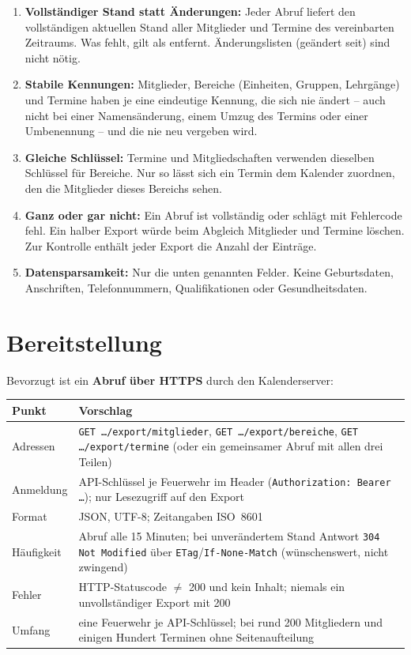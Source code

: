 \documentclass[a4paper,fontsize=10pt]{scrartcl}
\newcommand{\code}[1]{\texttt{#1}}
\begin{document}
\begin{enumerate}
  \item \textbf{Vollständiger Stand statt Änderungen:} Jeder Abruf liefert den
        vollständigen aktuellen Stand aller Mitglieder und Termine des
        vereinbarten Zeitraums. Was fehlt, gilt als entfernt. Änderungslisten
        (\glqq geändert seit\grqq) sind nicht nötig.
  \item \textbf{Stabile Kennungen:} Mitglieder, Bereiche (Einheiten, Gruppen,
        Lehrgänge) und Termine haben je eine eindeutige Kennung, die sich nie
        ändert -- auch nicht bei einer Namensänderung, einem Umzug des Termins
        oder einer Umbenennung -- und die nie neu vergeben wird.
  \item \textbf{Gleiche Schlüssel:} Termine und Mitgliedschaften verwenden
        dieselben Schlüssel für Bereiche. Nur so lässt sich ein Termin dem
        Kalender zuordnen, den die Mitglieder dieses Bereichs sehen.
  \item \textbf{Ganz oder gar nicht:} Ein Abruf ist vollständig oder schlägt
        mit Fehlercode fehl. Ein halber Export würde beim Abgleich Mitglieder
        und Termine löschen. Zur Kontrolle enthält jeder Export die Anzahl der
        Einträge.
  \item \textbf{Datensparsamkeit:} Nur die unten genannten Felder. Keine
        Geburtsdaten, Anschriften, Telefonnummern, Qualifikationen oder
        Gesundheitsdaten.
\end{enumerate}

\section{Bereitstellung}

Bevorzugt ist ein \textbf{Abruf über HTTPS} durch den Kalenderserver:

\begin{center}
\begin{tabularx}{\textwidth}{L{4.2cm}X}
\toprule
\textbf{Punkt} & \textbf{Vorschlag} \\
\midrule
Adressen & \code{GET …/export/mitglieder}, \code{GET …/export/bereiche},
  \code{GET …/export/termine} (oder ein gemeinsamer Abruf mit allen drei
  Teilen) \\
Anmeldung & API-Schlüssel je Feuerwehr im Header
  (\code{Authorization: Bearer …}); nur Lesezugriff auf den Export \\
Format & JSON, UTF-8; Zeitangaben ISO~8601 \\
Häufigkeit & Abruf alle 15 Minuten; bei unverändertem Stand Antwort
  \code{304 Not Modified} über \code{ETag}/\code{If-None-Match} (wünschenswert,
  nicht zwingend) \\
Fehler & HTTP-Statuscode $\neq$ 200 und kein Inhalt; niemals ein
  unvollständiger Export mit 200 \\
Umfang & eine Feuerwehr je API-Schlüssel; bei rund 200 Mitgliedern und
  einigen Hundert Terminen ohne Seitenaufteilung \\
\bottomrule
\end{tabularx}
\end{center}
\end{document}
